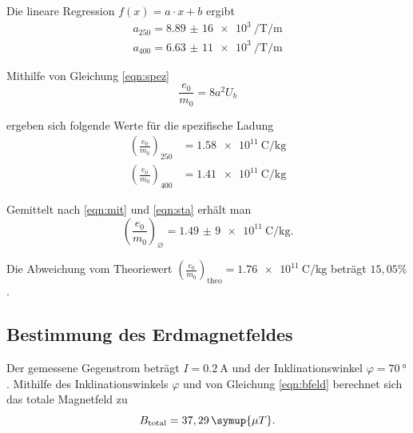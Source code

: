 Die lineare Regression $f(x) = a \cdot x + b$ ergibt
\begin{align*}
  a_{250} = \SI{8,89(16)e3}{\per \tesla \per \meter} \\
  a_{400} = \SI{6,63(11)e3}{\per \tesla \per \meter}
\end{align*}

Mithilfe von Gleichung \eqref{eqn:spez}
\begin{equation}
  \frac{e_0}{m_0} = 8 a^2 U_b
  \label{eqn:spez}
\end{equation}

ergeben sich folgende Werte für die spezifische Ladung
\begin{align*}
  \left(\frac{e_0}{m_0}\right)_{250} &= \SI{1,58e11}{\coulomb \per \kg} \\
  \left(\frac{e_0}{m_0}\right)_{400} &= \SI{1,41e11}{\coulomb \per \kg}
\end{align*}

Gemittelt nach \eqref{eqn:mit} und \eqref{eqn:sta} erhält man
\begin{equation*}
\left(\frac{e_0}{m_0}\right)_{\!\!\diameter} = \SI{1,49(9)e11}{\coulomb \per \kg}.
\end{equation*}

Die Abweichung vom Theoriewert \cite{scipy} $\left(\frac{e_0}{m_0}\right)_\text{theo}=\SI{1,76e11}{\coulomb \per \kg}$ beträgt $15,05 \%$.

\subsection{Bestimmung des Erdmagnetfeldes}

Der gemessene Gegenstrom beträgt $I = \SI{0,2}{\A}$ und der Inklinationswinkel $\varphi = \SI{70}{°}$.
Mithilfe des Inklinationswinkels $\varphi$ und von Gleichung \eqref{eqn:bfeld} berechnet sich das totale Magnetfeld zu
\begin{equation*}
  B_\text{total} = 37,29 \, \symup{\mu T} .
\end{equation*}
